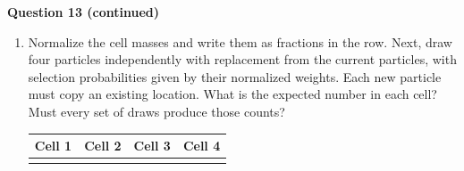 \documentclass[11pt]{article}
\newenvironment{studentanswer}[1]
  {\par\medskip\noindent
   \begin{tcolorbox}[height from=#1 to 100cm, colback=white, colframe=gray!60,
     boxrule=0.6pt, arc=0pt, outer arc=0pt, left=7pt, right=7pt,
     top=7pt, bottom=7pt, title={Answer / work}, fonttitle=\small,
     coltitle=black, colbacktitle=gray!8, titlerule=0pt]
   \ignorespaces}
  {\end{tcolorbox}\par}
\begin{document}
\clearpage
\noindent\textbf{Question 13 (continued)}
\begin{enumerate}[label=(\alph*),start=3]
\item \begin{minipage}[t]{\linewidth} Normalize the cell masses and write them as fractions in the
row. Next, draw four particles independently with replacement from the
current particles, with selection probabilities given by their normalized
weights. Each new particle must copy an existing location. What is the
expected number in each cell? Must every set of draws produce those counts?

\begin{studentanswer}{5cm}
\begin{center}\begin{tabular}{|p{1.5cm}|p{1.5cm}|p{1.5cm}|p{1.5cm}|}\hline
Cell 1 & Cell 2 & Cell 3 & Cell 4\\\hline
\rule{0pt}{.8cm}&&&\\\hline\end{tabular}\end{center}
\end{studentanswer}

\end{minipage}
\end{enumerate}
\clearpage
\end{document}
